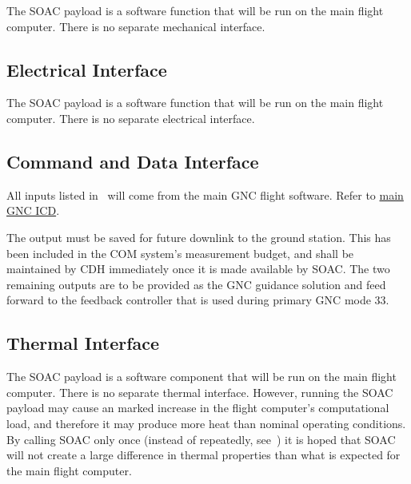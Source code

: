 \documentclass[10pt]{article}
\begin{document}
The SOAC payload is a software function that will be run on the main flight computer. There is no separate mechanical interface.

\subsection{Electrical Interface}\label{sec2:elec_interface}

The SOAC payload is a software function that will be run on the main flight computer. There is no separate electrical interface. 

\subsection{Command and Data Interface}\label{sec2:cmd_interface}

All inputs listed in~ will come from the main GNC flight software. Refer to \href{https://drive.google.com/open?id=1wTjmsQdXGk9jmEHy59fZAdBJJ3r1IE4LGFjHT2S5png}{main GNC ICD}.

The output  must be saved for future downlink to the ground station. This has been included in the COM system's measurement budget, and shall be maintained by CDH immediately once it is made available by SOAC. The two remaining outputs are to be provided as the GNC guidance solution and feed forward to the feedback controller that is used during primary GNC mode $33$. 

\subsection{Thermal Interface}\label{sec2:thermal_interface}

The SOAC payload is a software component that will be run on the main flight computer. There is no separate thermal interface. However, running the SOAC payload may cause an marked increase in the flight computer's computational load, and therefore it may produce more heat than nominal operating conditions. By calling SOAC only once (instead of repeatedly, see~) it is hoped that SOAC will not create a large difference in thermal properties than what is expected for the main flight computer.

\end{document}
